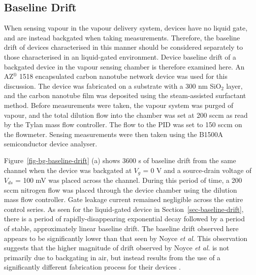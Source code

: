 \documentclass[
  a4paper,
]{scrbook}
\begin{document}
\hypertarget{sec-vapour-drift}{%
\subsection{Baseline Drift}\label{sec-vapour-drift}}

When sensing vapour in the vapour delivery system, devices have no
liquid gate, and are instead backgated when taking measurements.
Therefore, the baseline drift of devices characterised in this manner
should be considered separately to those characterised in an
liquid-gated environment. Device baseline drift of a backgated device in
the vapour sensing chamber is therefore examined here. An
AZ\(^\circledR\) 1518 encapsulated carbon nanotube network device was
used for this discussion. The device was fabricated on a substrate with
a 300 nm SiO\(_2\) layer, and the carbon nanotube film was deposited
using the steam-assisted surfactant method. Before measurements were
taken, the vapour system was purged of vapour, and the total dilution
flow into the chamber was set at 200 sccm as read by the Tylan mass flow
controller. The flow to the PID was set to 150 sccm on the flowmeter.
Sensing measurements were then taken using the B1500A semiconductor
device analyser.

Figure~\ref{fig-bg-baseline-drift} (a) shows 3600 s of baseline drift
from the same channel when the device was backgated at \(V_g\) = 0 V and
a source-drain voltage of \(V_{ds}\) = 100 mV was placed across the
channel. During this period of time, a 200 sccm nitrogen flow was placed
through the device chamber using the dilution mass flow controller. Gate
leakage current remained negligible across the entire control series. As
seen for the liquid-gated device in Section~\ref{sec-baseline-drift},
there is a period of rapidly-disappearing exponential decay followed by
a period of stable, approximately linear baseline drift. The baseline
drift observed here appears to be significantly lower than that seen by
Noyce \emph{et al.} This observation suggests that the higher magnitude
of drift observed by Noyce \emph{et al.} is not primarily due to
backgating in air, but instead results from the use of a significantly
different fabrication process for their devices \autocite{Noyce2019}.
\end{document}
